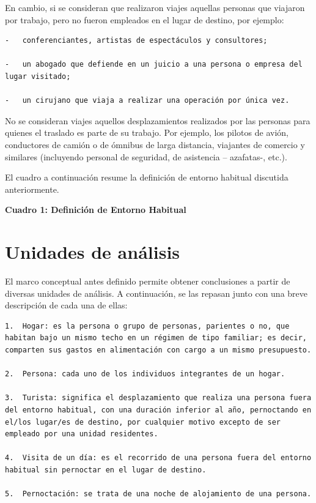 \documentclass[
  openany]{book}
\begin{document}
En cambio, si se consideran que realizaron viajes aquellas personas que viajaron por trabajo, pero no fueron empleados en el lugar de destino, por ejemplo:

\begin{verbatim}
-   conferenciantes, artistas de espectáculos y consultores;

-   un abogado que defiende en un juicio a una persona o empresa del lugar visitado;

-   un cirujano que viaja a realizar una operación por única vez.
\end{verbatim}

No se consideran viajes aquellos desplazamientos realizados por las personas para quienes el traslado es parte de su trabajo. Por ejemplo, los pilotos de avión, conductores de camión o de ómnibus de larga distancia, viajantes de comercio y similares (incluyendo personal de seguridad, de asistencia -- azafatas-, etc.).

El cuadro a continuación resume la definición de entorno habitual discutida anteriormente.

\textbf{Cuadro 1: Definición de Entorno Habitual}

\hypertarget{unidades-de-anuxe1lisis}{%
\section{Unidades de análisis}\label{unidades-de-anuxe1lisis}}

El marco conceptual antes definido permite obtener conclusiones a partir de diversas unidades de análisis. A continuación, se las repasan junto con una breve descripción de cada una de ellas:

\begin{verbatim}
1.  Hogar: es la persona o grupo de personas, parientes o no, que habitan bajo un mismo techo en un régimen de tipo familiar; es decir, comparten sus gastos en alimentación con cargo a un mismo presupuesto.

2.  Persona: cada uno de los individuos integrantes de un hogar.

3.  Turista: significa el desplazamiento que realiza una persona fuera del entorno habitual, con una duración inferior al año, pernoctando en el/los lugar/es de destino, por cualquier motivo excepto de ser empleado por una unidad residentes.

4.  Visita de un día: es el recorrido de una persona fuera del entorno habitual sin pernoctar en el lugar de destino.

5.  Pernoctación: se trata de una noche de alojamiento de una persona.
\end{verbatim}
\end{document}
